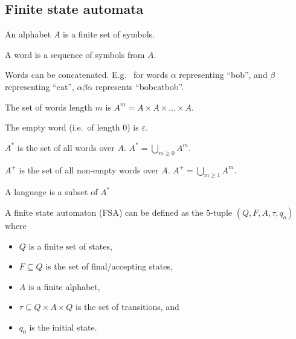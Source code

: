 \documentclass{article}
\begin{document}
\subsection{Finite state automata}
\begin{definition}[Alphabet]
    An alphabet \(A\) is a finite set of symbols.
\end{definition}
\begin{definition}[Word]
    A word is a sequence of symbols from \(A\).
\end{definition}
\begin{theorem}
    Words can be concatenated.
    E.g. \ for words \(\alpha\) representing ``bob'',
    and \(\beta\) representing ``cat'',
    \(\alpha\beta\alpha\) represents ``bobcatbob''.
\end{theorem}
\begin{theorem}
    The set of words length \(m\) is \(A^m = A\times A\times \ldots \times A\).
\end{theorem}
\begin{theorem}
    The empty word (i.e.\ of length 0) is \(\varepsilon\).
\end{theorem}
\begin{theorem}
    \(A^*\) is the set of all words over \(A\). \(A^* = \bigcup_{m\ge 0} A^m\).
\end{theorem}
\begin{theorem}
    \(A^+\) is the set of all non-empty words over \(A\). \(A^+ = \bigcup_{m\ge 1} A^m\).
\end{theorem}
\begin{definition}[Language]
    A language is a subset of \(A^*\)
\end{definition}
\begin{definition}
    A finite state automaton (FSA)
    can be defined as the 5-tuple
    \(\left(Q, F, A, \tau, q_o\right)\) where
    \begin{itemize}
        \item    \(Q\) is a finite set of states,
        \item    \(F\subseteq Q\) is the set of final/accepting states,
        \item    \(A\) is a finite alphabet,
        \item    \(\tau\subseteq Q\times A\times Q\) is the set of transitions, and
        \item    \(q_0\) is the initial state.
    \end{itemize}
\end{definition}
\end{document}
